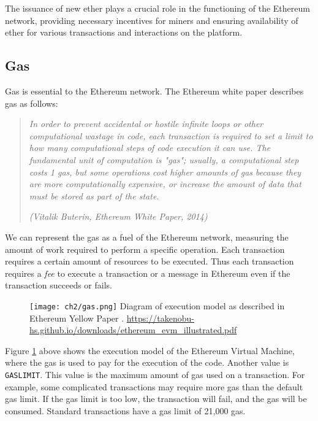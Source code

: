 The issuance of new ether plays a crucial role in the functioning of the Ethereum network, providing necessary incentives for miners and ensuring
availability of ether for various transactions and interactions on the platform.




\subsection{Gas}
\label{subsec:gas}


Gas is essential to the Ethereum network. The Ethereum white paper \cite{ethereum_white_paper} describes gas as follows:


\begin{quote}
   \textit{In order to prevent accidental or hostile infinite loops or other computational wastage in code, each transaction is
       required to set a limit to how many computational steps of code execution it can use. The fundamental unit of computation is "gas";
       usually, a computational step costs 1 gas, but some operations cost higher amounts of gas because they are more computationally expensive,
       or increase the amount of data that must be stored as part of the state.}


   \textit{(Vitalik Buterin, Ethereum White Paper, 2014)}
\end{quote}

We can represent the gas as a fuel of the Ethereum network, measuring the amount of work required to perform a specific operation.
Each transaction requires a certain amount of resources to be executed. Thus each transaction requires a \textit{fee}  to
execute a transaction or a message in Ethereum even if the transaction succeeds or fails.

\begin{figure}[H]
   \centering
   \texttt{[image: ch2/gas.png]}
   {Diagram of execution model as described in Ethereum Yellow Paper \cite{ethereum_yellow_paper}.}
   {\url{https://takenobu-hs.github.io/downloads/ethereum_evm_illustrated.pdf}}
   \label{fig:gas}
\end{figure}


Figure \ref{fig:gas} above shows the execution model of the Ethereum Virtual Machine, where the gas is used to pay for the execution of the code. Another
value is \texttt{GASLIMIT}. This value is the maximum amount of gas used on a transaction. For example, some complicated transactions may require more gas than the
default gas limit. If the gas limit is too low, the transaction will fail, and the gas will be consumed. Standard transactions have a gas limit of 21,000 gas.


